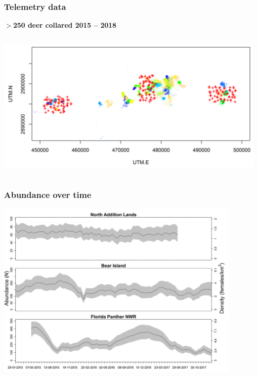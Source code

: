 \documentclass[color=usenames,dvipsnames]{beamer}
\begin{document}
\begin{frame}
  \frametitle{Telemetry data}
  \centering
  \bf
  $>$250 deer collared 2015 -- 2018 \\
  \begin{columns}
    \column{\dimexpr\paperwidth-10pt}
    \includegraphics[width=\textwidth]{figs/camTelem}
  \end{columns}
\end{frame}



\begin{frame}
  \frametitle{Abundance over time}
  \centering
  \includegraphics[width=0.9\textwidth]{figs/deer-N-timeseries} \\
\end{frame}
\end{document}

